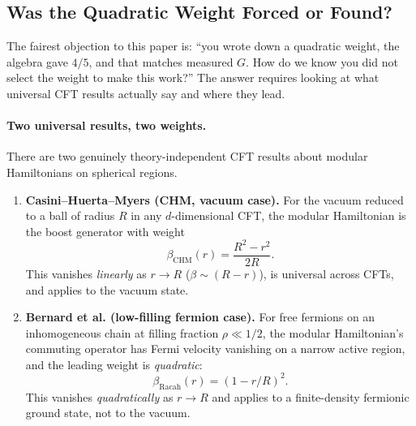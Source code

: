 \documentclass[11pt,letterpaper]{article}
\begin{document}
\subsection{Was the Quadratic Weight Forced or Found?}
\label{sec:weight_forced}

The fairest objection to this paper is: ``you wrote down a quadratic
weight, the algebra gave $4/5$, and that matches measured $G$. How
do we know you did not select the weight to make this work?'' The
answer requires looking at what universal CFT results actually say
and where they lead.

\paragraph{Two universal results, two weights.}
There are two genuinely theory-independent CFT results about modular
Hamiltonians on spherical regions.

\begin{enumerate}
  \item \textbf{Casini--Huerta--Myers (CHM, vacuum case).} For the
    vacuum reduced to a ball of radius $R$ in any $d$-dimensional
    CFT, the modular Hamiltonian is the boost generator with weight
    \begin{equation}
      \beta_{\mathrm{CHM}}(r) = \frac{R^2 - r^2}{2R}.
      \label{eq:chm_weight}
    \end{equation}
    This vanishes \emph{linearly} as $r \to R$
    ($\beta \sim (R-r)$), is universal across CFTs, and applies to
    the vacuum state.
  \item \textbf{Bernard et al. (low-filling fermion case).} For free
    fermions on an inhomogeneous chain at filling fraction
    $\rho \ll 1/2$, the modular Hamiltonian's commuting operator
    has Fermi velocity vanishing on a narrow active region, and the
    leading weight is \emph{quadratic}:
    \begin{equation}
      \beta_{\mathrm{Racah}}(r) = (1 - r/R)^2.
      \label{eq:racah_weight}
    \end{equation}
    This vanishes \emph{quadratically} as $r \to R$ and applies to
    a finite-density fermionic ground state, not to the vacuum.
\end{enumerate}
\end{document}

